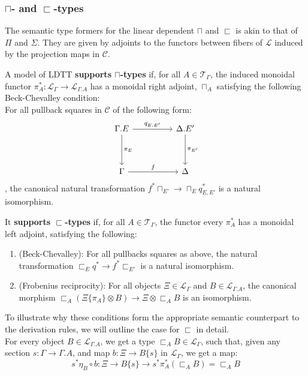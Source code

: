 \subsubsection{$\sqcap$- and $\sqsubset$-types}
The semantic type formers for the linear dependent $\sqcap$ and $\sqsubset$ is akin to that of $\Pi$ and $\Sigma$. They are given by adjoints to the functors between fibers of $\mathcal{L}$ induced by the projection maps in $\mathcal{C}$.
\begin{defn}
  A model of LDTT \textbf{supports $\sqcap$-types} if, for all $A \in \mathcal{T}_{\Gamma}$, the induced monoidal functor $\pi_A^* : \mathcal{L}_{\Gamma} \to \mathcal{L}_{\Gamma.A}$ has a monoidal right adjoint, $\sqcap_A$ satisfying the following Beck-Chevalley condition:\\
  For all pullback squares in $\mathcal{C}$ of the following form:
  \[
      \ti
    \Gamma.E \ar[d, "\pi_E"] \ar[r, "q_{E, E'}"] & \Delta.E' \ar[d, "\pi_{E'}"] \\
    \Gamma \ar[r, "f"] & \Delta
    \kz
  \],
the canonical natural transformation $f^*\sqcap_{E'} \to \sqcap_{E}q^*_{E, E'}$ is a natural isomorphism.\\
\end{defn}
\begin{defn}
  It \textbf{supports $\sqsubset$-types} if, for all $A \in \mathcal{T}_{\Gamma}$, the functor every $\pi_A^*$ has a monoidal left adjoint, satisfying the following:
  \begin{enumerate}
  \item (Beck-Chevalley): For all pullbacks squares as above, the natural transformation $\sqsubset_Eq^* \to f^*\sqsubset_{E'}$ is a natural isomorphism.
  \item (Frobenius reciprocity): For all objects $\Xi \in \mathcal{L}_{\Gamma}$ and $B \in \mathcal{L}_{\Gamma.A}$, the canonical morphism $\sqsubset_A(\Xi\{\pi_A\} \otimes B) \to \Xi \otimes \sqsubset_AB$ is an isomorphism.
  \end{enumerate}
\end{defn}
To illustrate why these conditions form the appropriate semantic counterpart to the derivation rules, we will outline the case for $\sqsubset$ in detail.\\
For every object $B \in \mathcal{L}_{\Gamma.A}$, we get a type $\sqsubset_AB \in \mathcal{L}_{\Gamma}$, such that, given any section $s : \Gamma \to \Gamma.A$, and map $b : \Xi \to B\{s\}$ in $\mathcal{L}_{\Gamma}$, we get a map:
\[
  s^*\eta_B \circ b : \Xi \to B\{s\} \to s^*\pi_A^*(\sqsubset_AB) = \sqsubset_AB
\]

